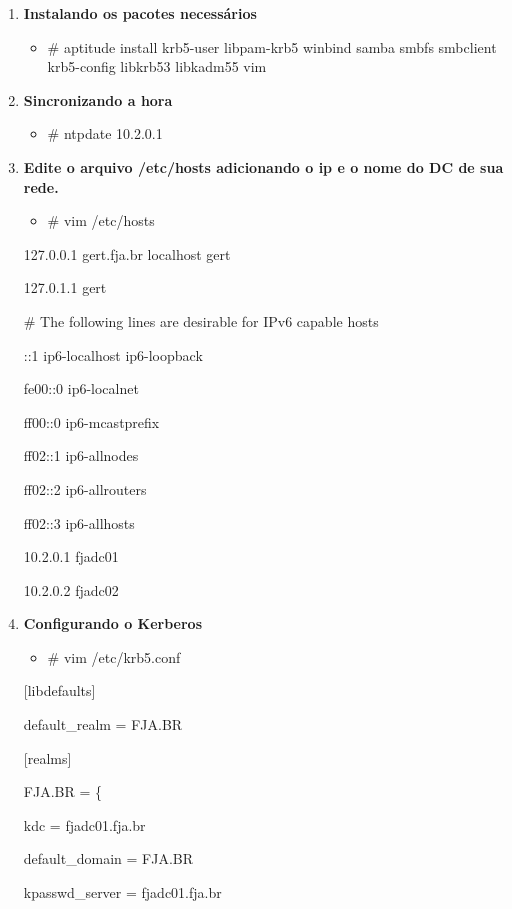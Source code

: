 \begin{enumerate}
	\item \textbf{Instalando os pacotes necessários}
		\begin{itemize}
			\item {\# aptitude install krb5-user libpam-krb5 winbind samba smbfs smbclient krb5-config libkrb53 libkadm55 vim}
		\end{itemize}

	\item \textbf{Sincronizando a hora}
		\begin{itemize}
			\item {\# ntpdate 10.2.0.1}
		\end{itemize}

	\item \textbf{Edite o arquivo /etc/hosts adicionando o ip e o nome do DC de sua rede.}
		\begin{itemize}
				\item {\# vim /etc/hosts}
		\end{itemize}

		127.0.0.1       gert.fja.br localhost gert

		127.0.1.1       gert

		\# The following lines are desirable for IPv6 capable hosts

		::1     ip6-localhost ip6-loopback

		fe00::0 ip6-localnet

		ff00::0 ip6-mcastprefix

		ff02::1 ip6-allnodes

		ff02::2 ip6-allrouters

		ff02::3 ip6-allhosts

		10.2.0.1   fjadc01

		10.2.0.2   fjadc02

	\item \textbf{Configurando o Kerberos}
		\begin{itemize}
				\item {\# vim /etc/krb5.conf}
		\end{itemize}

		[libdefaults]

		default\_realm = FJA.BR

		[realms]

    	FJA.BR = \{

      	kdc = fjadc01.fja.br

      	default\_domain = FJA.BR

      	kpasswd\_server = fjadc01.fja.br


\end{enumerate}
